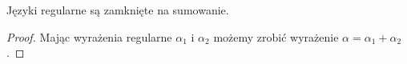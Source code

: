 \begin{theorem}
    Języki regularne są zamknięte na sumowanie.
\end{theorem}
\begin{proof}
    Mając wyrażenia regularne \(\alpha_1\) i \(\alpha_2\) możemy zrobić wyrażenie \(\alpha = \alpha_1 + \alpha_2\).
\end{proof}
